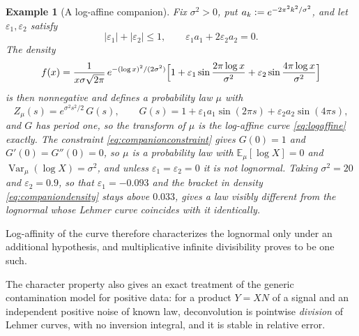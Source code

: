 \documentclass[sn-mathphys-num]{sn-jnl}
\theoremstyle{thmstyleone}%
\theoremstyle{thmstyletwo}%
\newtheorem{example}{Example}%
\theoremstyle{thmstylethree}%
\theoremstyle{thmstyleone}%
\providecommand{\E}{\mathbb{E}}
\providecommand{\Var}{\operatorname{Var}}
\providecommand{\eqdef}{\mathrel{\vcentcolon=}}
\begin{document}
	\begin{example}[A log-affine companion]\label{ex:logaffinecompanion}
		Fix $\sigma^2>0$, put $a_k\eqdef e^{-2\pi^2k^2/\sigma^2}$, and let
		$\varepsilon_1,\varepsilon_2$ satisfy
		\begin{equation}\label{eq:companionconstraint}
			|\varepsilon_1|+|\varepsilon_2|\le1,
			\qquad
			\varepsilon_1a_1+2\varepsilon_2a_2=0 .
		\end{equation}
		The density
		\begin{equation}\label{eq:companiondensity}
			f(x)=\frac{1}{x\sigma\sqrt{2\pi}}\,
			e^{-(\log x)^2/(2\sigma^2)}
			\Bigl[1+\varepsilon_1\sin\frac{2\pi\log x}{\sigma^2}
			+\varepsilon_2\sin\frac{4\pi\log x}{\sigma^2}\Bigr]
		\end{equation}
		is then nonnegative and defines a probability law $\mu$ with
		\begin{equation}\label{eq:companionZ}
			Z_\mu(s)=e^{\sigma^2s^2/2}\,G(s),
			\qquad G(s)=1+\varepsilon_1a_1\sin(2\pi s)
			+\varepsilon_2a_2\sin(4\pi s),
		\end{equation}
		and $G$ has period one, so the transform of $\mu$ is the
		log-affine curve \eqref{eq:logaffine} exactly. The constraint
		\eqref{eq:companionconstraint} gives $G(0)=1$ and
		$G'(0)=G''(0)=0$, so $\mu$ is a probability law with
		$\E_\mu[\log X]=0$ and $\Var_\mu(\log X)=\sigma^2$, and
		unless $\varepsilon_1=\varepsilon_2=0$ it is not lognormal.
		Taking $\sigma^2=20$ and $\varepsilon_2=0.9$, so that
		$\varepsilon_1=-0.093$ and the bracket in density
		\eqref{eq:companiondensity} stays above $0.033$, gives a law
		visibly different from the lognormal whose Lehmer curve coincides
		with it identically.
	\end{example}
	
	Log-affinity of the curve therefore characterizes the lognormal
	only under an additional hypothesis, and multiplicative infinite
	divisibility proves to be one such.
	
	The character property also gives an exact treatment of the generic
	contamination model for positive data: for a product $Y=XN$ of a
	signal and an independent positive noise of known law,
	deconvolution is pointwise \emph{division} of Lehmer curves, with
	no inversion integral, and it is stable in relative error.
	
\end{document}
